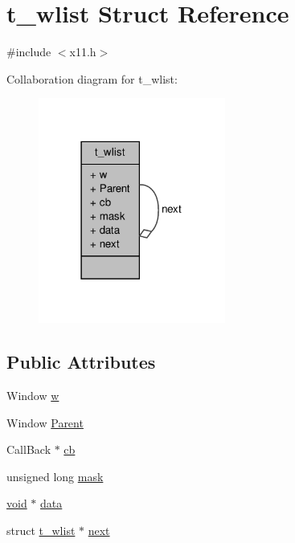 \hypertarget{structt__wlist}{\section{t\-\_\-wlist \-Struct \-Reference}
\label{structt__wlist}
}


{\ttfamily \#include $<$x11.\-h$>$}



\-Collaboration diagram for t\-\_\-wlist\-:
\nopagebreak
\begin{figure}[H]
\begin{center}
\leavevmode
\includegraphics[width=174pt]{structt__wlist__coll__graph}
\end{center}
\end{figure}
\subsection*{\-Public \-Attributes}
\begin{DoxyCompactItemize}
\item 
\-Window \hyperlink{structt__wlist_adc2c39819bfd58e1bcfd137338d0ac79}{w}
\item 
\-Window \hyperlink{structt__wlist_a1831216a15911ce8e66ed57ccaeff3e7}{\-Parent}
\item 
\-Call\-Back $\ast$ \hyperlink{structt__wlist_a3cf36d2852bf002d53ac4996968d18eb}{cb}
\item 
unsigned long \hyperlink{structt__wlist_aad10a7561fc500359a70400eb2e1ccb8}{mask}
\item 
\hyperlink{nbnxn__kernel__simd__4xn__outer_8h_a8dc3f4a797ed992dff49d2fa3477eee8}{void} $\ast$ \hyperlink{structt__wlist_a61ba92badbd525c2621f7224da9ab252}{data}
\item 
struct \hyperlink{structt__wlist}{t\-\_\-wlist} $\ast$ \hyperlink{structt__wlist_aa70b5dbf4b5f4f7f5e3fd8c82875ca57}{next}
\end{DoxyCompactItemize}


